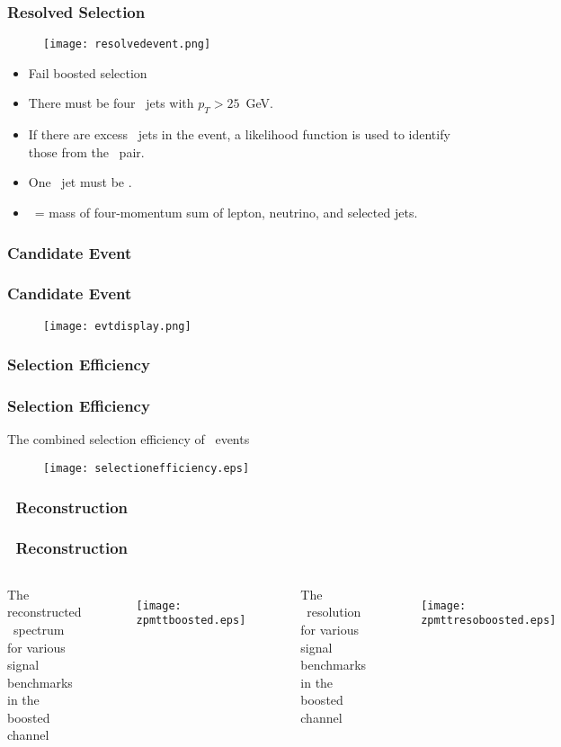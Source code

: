 \begin{frame}
    \frametitle{Resolved Selection}
\begin{figure}
\centering
\texttt{[image: resolvedevent.png]}
\end{figure}
\vfill
\begin{itemize}
    \item Fail boosted selection
    \item There must be four \smallr\ jets with $p_T > 25$~GeV.
    \item If there are excess \smallr\ jets in the event, a
        likelihood function is used to identify those from the \ttbar\
        pair.
    \item One \smallr\ jet must be .
    \item \mtt\ = mass of four-momentum sum of lepton, neutrino, and
        selected jets.
\end{itemize}
\end{frame}

\subsubsection{Candidate Event}
\begin{frame}
\centering
\frametitle{Candidate Event}
\begin{figure}
    \texttt{[image: evtdisplay.png]}
\end{figure}
\end{frame}


\subsubsection{Selection Efficiency}
\begin{frame}
    \frametitle{Selection Efficiency}
\centering
The combined selection efficiency of \ttbar\ events
\begin{figure}
\texttt{[image: selectionefficiency.eps]}
\end{figure}
\end{frame}

\subsubsection{\mtt\ Reconstruction}
\begin{frame}
\frametitle{\mtt\ Reconstruction}
\begin{columns}
\centering
The reconstructed \mtt\ spectrum for various signal benchmarks in the
boosted channel
\begin{figure}
\texttt{[image: zpmttboosted.eps]}
\end{figure}
\centering
The \mtt\ resolution for various signal benchmarks in the boosted
channel
\begin{figure}
\texttt{[image: zpmttresoboosted.eps]}
\end{figure}
\end{columns}
\end{frame}

